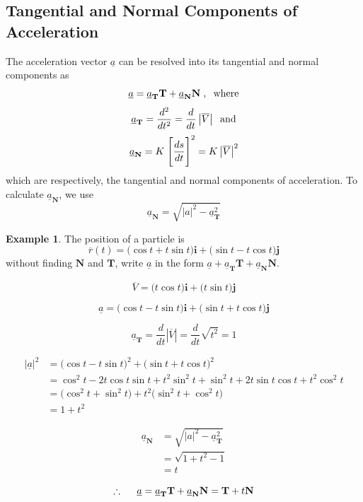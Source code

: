 \documentclass[11pt,a4paper]{article}
\theoremstyle{definition}
\newtheorem{exa}[thm]{Example}
\begin{document}
\subsection{Tangential and Normal Components of Acceleration}
The acceleration vector $\underline{a}$ can be resolved  into its tangential and normal components as $$\underline{a} = \underline{a}_{\textbf{T}}\textbf{T} + \underline{a}_{\textbf{N}}\textbf{N}\hspace{0.1cm} , \hspace{0.2cm}\text{where}$$
$$\underline{a}_{\textbf{T}} = \dfrac{d^2}{dt^2} = \frac{d}{dt}\left|\overline{V}\right|\hspace{0.2cm}\text{and}$$
$$\underline{a}_{\textbf{N}} = K\hspace{0.1cm}\Bigg[\dfrac{ds}{dt}\Bigg]^2 = K\left|\overline{V}\right|^2$$
which are respectively, the tangential and normal components of acceleration. To calculate $\underline{a}_{\textbf{N}}$, we use
$$\underline{a}_{\textbf{N}} = \sqrt{\left|a\right|^2- \underline{a}_{\textbf{T}}^2
}$$


\begin{exa}


The position of a particle is $$\overline{r}(t) = \big(\cos t + t\sin t\big)\textbf{i} + \big(\sin t - t\cos t\big)\textbf{j}$$
without finding $\textbf{N}$ and $\textbf{T}$, write $\underline{a}$ in the form $\underline{a} + \underline{a}_{\textbf{T}}\textbf{T} + \underline{a}_{\textbf{N}}\textbf{N}$.

$$\overline{V} = \big(t\cos t \big)\textbf{i} + \big( t\sin t \big)\textbf{j}$$

$$\underline{a} = \big(\cos t - t\sin t\big)\textbf{i} + \big(\sin t + t\cos t \big) \textbf{j}$$

$$\underline{a}_{\textbf{T}} = \dfrac{d}{dt}\left|\overline{V}\right| = \frac{d}{dt}\sqrt{t^2} = 1$$

\begin{align*}
\left|\underline{a}\right|^ 2 & = \big(\cos t - t \sin t\big)^2 + \big( \sin t + t\cos t\big)^2\\
& = \cos^2 t - 2t\cos t \sin t + t^2\sin ^2 t + \sin ^2 t + 2t\sin t \cos t + t^2 \cos^2 t\\
& = \big(\cos^2t + \sin^2t\big) + t^2\big(\sin^2t+\cos^2 t\big)\\
& = 1 + t^2
\end{align*}

\begin{align*}
\underline{a}_{\textbf{N}} & = \sqrt{\left|a\right|^2- \underline{a}_{\textbf{T}}^2
}\\
& = \sqrt{1 + t^2 - 1}\\
& = t
\end{align*}

$$\therefore\hspace{0.5cm} \underline{a} = \underline{a}_{\textbf{T}}\textbf{T} + \underline{a}_{\textbf{N}}\textbf{N} =\textbf{T} + t\textbf{N}$$


\pagebreak
\end{exa}
\end{document}
